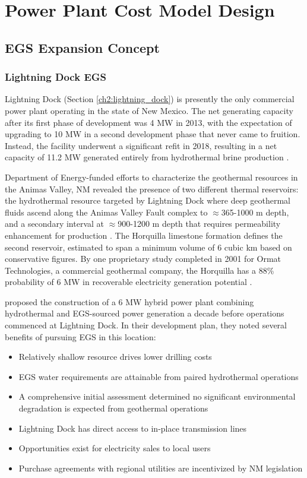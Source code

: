 \chapter{Power Plant Cost Model Design}
\label{ch4:cm_prep}

\section{EGS Expansion Concept}\label{ch4:cm_concept}
\subsection{Lightning Dock EGS}

Lightning Dock (Section \ref{ch2:lightning_dock}) is presently the only commercial power plant operating in the state of New Mexico. The net generating capacity after its first phase of development was 4 MW in 2013, with the expectation of upgrading to 10 MW in a second development phase that never came to fruition. Instead, the facility underwent a significant refit in 2018, resulting in a net capacity of 11.2 MW generated entirely from hydrothermal brine production \citep{bonafin_repowering_2019}. 

Department of Energy-funded efforts to characterize the geothermal resources in the Animas Valley, NM revealed the presence of two different thermal reservoirs: the hydrothermal resource targeted by Lightning Dock where deep geothermal fluids ascend along the Animas Valley Fault complex to $\approx$365-1000 m depth, and a secondary interval at $\approx$900-1200 m depth that requires permeability enhancement for production \citep{schochet_development_2001}. The Horquilla limestone formation defines the second reservoir, estimated to span a minimum volume of 6 cubic km based on conservative figures. By one proprietary study completed in 2001 for Ormat Technologies, a commercial geothermal company, the Horquilla has a 88\% probability of 6 MW in recoverable electricity generation potential \citep{schochet_development_2001}.

\citet{schochet_development_2001} proposed the construction of a 6 MW hybrid power plant combining hydrothermal and EGS-sourced power generation a decade before operations commenced at Lightning Dock. In their development plan, they noted several benefits of pursuing EGS in this location:
\begin{itemize}[itemsep=2pt]\label{ch4:ld_egs_support}
    \item Relatively shallow resource drives lower drilling costs
    \item EGS water requirements are attainable from paired hydrothermal operations
    \item A comprehensive initial assessment determined no significant environmental degradation is expected from geothermal operations
    \item Lightning Dock has direct access to in-place transmission lines  
    \item Opportunities exist for electricity sales to local users
    \item Purchase agreements with regional utilities are incentivized by NM legislation
\end{itemize}

